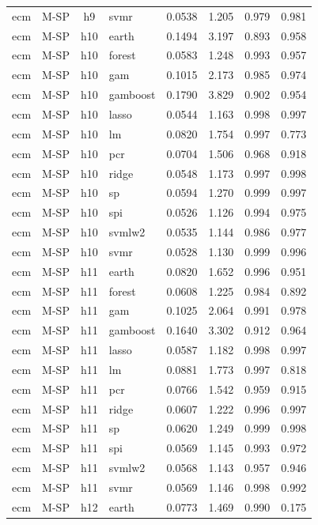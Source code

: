 \begin{ThreePartTable}
\begin{longtable}[t]{llclcccc}
ecm & M-SP & h9 & svmr & 0.0538 & 1.205 & 0.979 & 0.981\\
\addlinespace
ecm & M-SP & h10 & earth & 0.1494 & 3.197 & 0.893 & 0.958\\
ecm & M-SP & h10 & forest & 0.0583 & 1.248 & 0.993 & 0.957\\
ecm & M-SP & h10 & gam & 0.1015 & 2.173 & 0.985 & 0.974\\
ecm & M-SP & h10 & gamboost & 0.1790 & 3.829 & 0.902 & 0.954\\
ecm & M-SP & h10 & lasso & 0.0544 & 1.163 & 0.998 & 0.997\\
ecm & M-SP & h10 & lm & 0.0820 & 1.754 & 0.997 & 0.773\\
ecm & M-SP & h10 & pcr & 0.0704 & 1.506 & 0.968 & 0.918\\
ecm & M-SP & h10 & ridge & 0.0548 & 1.173 & 0.997 & 0.998\\
ecm & M-SP & h10 & sp & 0.0594 & 1.270 & 0.999 & 0.997\\
ecm & M-SP & h10 & spi & 0.0526 & 1.126 & 0.994 & 0.975\\
ecm & M-SP & h10 & svmlw2 & 0.0535 & 1.144 & 0.986 & 0.977\\
ecm & M-SP & h10 & svmr & 0.0528 & 1.130 & 0.999 & 0.996\\
\addlinespace
ecm & M-SP & h11 & earth & 0.0820 & 1.652 & 0.996 & 0.951\\
ecm & M-SP & h11 & forest & 0.0608 & 1.225 & 0.984 & 0.892\\
ecm & M-SP & h11 & gam & 0.1025 & 2.064 & 0.991 & 0.978\\
ecm & M-SP & h11 & gamboost & 0.1640 & 3.302 & 0.912 & 0.964\\
ecm & M-SP & h11 & lasso & 0.0587 & 1.182 & 0.998 & 0.997\\
ecm & M-SP & h11 & lm & 0.0881 & 1.773 & 0.997 & 0.818\\
ecm & M-SP & h11 & pcr & 0.0766 & 1.542 & 0.959 & 0.915\\
ecm & M-SP & h11 & ridge & 0.0607 & 1.222 & 0.996 & 0.997\\
ecm & M-SP & h11 & sp & 0.0620 & 1.249 & 0.999 & 0.998\\
ecm & M-SP & h11 & spi & 0.0569 & 1.145 & 0.993 & 0.972\\
ecm & M-SP & h11 & svmlw2 & 0.0568 & 1.143 & 0.957 & 0.946\\
ecm & M-SP & h11 & svmr & 0.0569 & 1.146 & 0.998 & 0.992\\
\addlinespace
ecm & M-SP & h12 & earth & 0.0773 & 1.469 & 0.990 & 0.175\\

\end{longtable}
\end{ThreePartTable}
